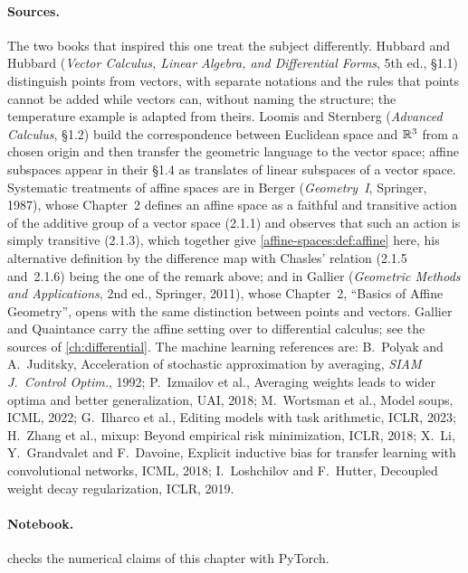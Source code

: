 \begin{notechapter}
\paragraph{Sources.} The two books that inspired this one treat the
subject differently. Hubbard and Hubbard (\emph{Vector Calculus, Linear
Algebra, and Differential Forms}, 5th ed., \S1.1) distinguish points from
vectors, with separate notations and the rules that points cannot be added
while vectors can, without naming the structure; the temperature example
is adapted from theirs. Loomis and Sternberg (\emph{Advanced Calculus},
\S1.2) build the
correspondence between Euclidean space and $\mathbb{R}^3$ from a chosen origin and
then transfer the geometric language to the vector space; affine subspaces
appear in their \S1.4 as translates of linear subspaces of a vector space.
Systematic treatments of affine spaces are in Berger
(\emph{Geometry~I}, Springer, 1987), whose Chapter~2 defines an affine
space as a faithful and transitive action of the additive group of a
vector space (2.1.1) and observes that such an action is simply
transitive (2.1.3), which together give
\cref{affine-spaces:def:affine} here, his alternative definition by the
difference map with Chasles' relation (2.1.5 and~2.1.6) being the one
of the remark above; and in Gallier
(\emph{Geometric Methods and Applications}, 2nd ed., Springer, 2011),
whose Chapter~2, ``Basics of Affine Geometry'', opens with the same
distinction between points and vectors. Gallier and
Quaintance carry the affine setting over to differential calculus; see
the sources of \cref{ch:differential}. The machine learning
references are: B.~Polyak and A.~Juditsky, Acceleration of stochastic
approximation by averaging, \emph{SIAM J.\ Control Optim.}, 1992;
P.~Izmailov et al., Averaging weights leads to wider optima and better
generalization, UAI, 2018; M.~Wortsman et al., Model soups, ICML, 2022;
G.~Ilharco et al., Editing models with task arithmetic, ICLR, 2023;
H.~Zhang et al., mixup: Beyond empirical risk minimization, ICLR, 2018;
X.~Li, Y.~Grandvalet and F.~Davoine, Explicit inductive bias for transfer
learning with convolutional networks, ICML, 2018; I.~Loshchilov and
F.~Hutter, Decoupled weight decay regularization, ICLR, 2019.

\paragraph{Notebook.}  checks the
numerical claims of this chapter with PyTorch.


\end{notechapter}
